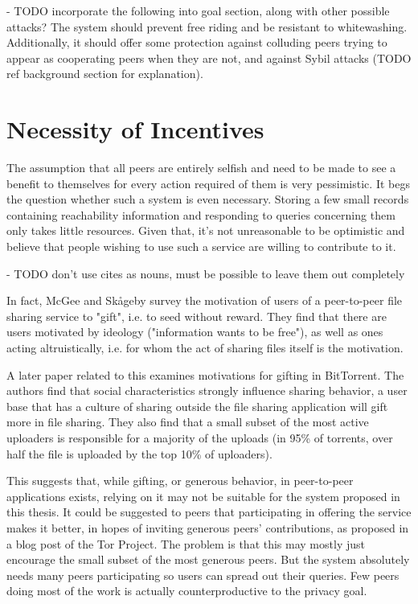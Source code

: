 - TODO incorporate the following into goal section, along with other possible
  attacks?
The system should prevent free riding and be resistant to whitewashing.
Additionally, it should offer some protection against colluding peers trying to
appear as cooperating peers when they are not, and against Sybil attacks (TODO
ref background section for explanation).

\section{Necessity of Incentives}
The assumption that all peers are entirely selfish and need to be made to see a
benefit to themselves for every action required of them is very pessimistic. It
begs the question whether such a system is even necessary. Storing a few small
records containing reachability information and responding to queries concerning
them only takes little resources. Given that, it's not unreasonable to be
optimistic and believe that people wishing to use such a service are willing to
contribute to it.

- TODO don't use cites as nouns, must be possible to leave them out completely

In fact, McGee and Sk{\aa}geby\cite{mcgee2004gifting} survey the motivation of
users of a peer-to-peer file sharing service to "gift", i.e. to seed without
reward. They find that there are users motivated by ideology ("information wants
to be free"), as well as ones acting altruistically, i.e. for whom the act of
sharing files itself is the motivation.

A later paper\cite{ripeanu2006gifting} related to this examines motivations for
gifting in BitTorrent. The authors find that social characteristics strongly
influence sharing behavior, a user base that has a culture of sharing outside
the file sharing application will gift more in file sharing. They also find that
a small subset of the most active uploaders is responsible for a majority of the
uploads (in 95\% of torrents, over half the file is uploaded by the top 10\% of
uploaders).

This suggests that, while gifting, or generous behavior, in peer-to-peer
applications exists, relying on it may not be suitable for the system proposed
in this thesis. It could be suggested to peers that participating in offering
the service makes it better, in hopes of inviting generous peers' contributions,
as proposed in a blog post of the Tor Project\cite{arma2009incentive_tor}. The
problem is that this may mostly just encourage the small subset of the most
generous peers. But the system absolutely needs many peers participating so
users can spread out their queries. Few peers doing most of the work is actually
counterproductive to the privacy goal.

